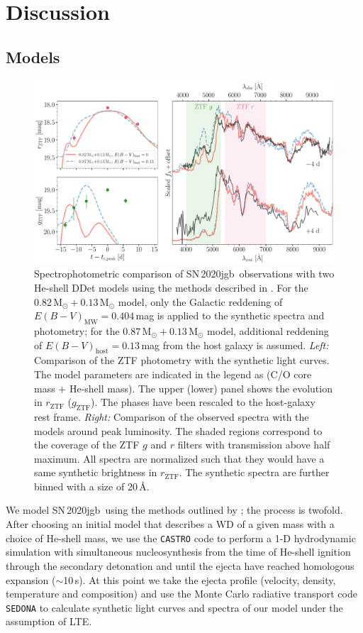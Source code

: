\documentclass[twocolumn]{aastex631}
\newcommand{\sn}{SN\,2020jgb}
\newcommand{\Msun}{\mathrm{M_\odot}}
\begin{document}
\section{Discussion} \label{sec:discussion}
\subsection{Models} \label{sec:model}
\begin{figure}
    \centering
    \includegraphics[width=\textwidth]{model.pdf}
    \caption{Spectrophotometric comparison of \sn\ observations with two He-shell DDet models using the methods described in \citet{polin_observational_2019}. For the $0.82\,\Msun+0.13\,\Msun$ model, only the Galactic reddening of $E(B-V)_\mathrm{MW}=0.404$\,mag is applied to the synthetic spectra and photometry; for the $0.87\,\Msun+0.13\,\Msun$ model, additional reddening of $E(B-V)_\mathrm{host}=0.13$\,mag from the host galaxy is assumed. {\it Left:} Comparison of the ZTF photometry with the synthetic light curves. The model parameters are indicated in the legend as (C/O core mass $+$ He-shell mass). The upper (lower) panel shows the evolution in $r_\mathrm{ZTF}$ ($g_\mathrm{ZTF}$). The phases have been rescaled to the host-galaxy rest frame. {\it Right:} Comparison of the observed spectra with the models around peak luminosity. The shaded regions correspond to the coverage of the ZTF $g$ and $r$ filters with transmission above half maximum. All spectra are normalized such that they would have a same synthetic brightness in $r_\mathrm{ZTF}$. The synthetic spectra are further binned with a size of 20\,\AA.}
    \label{fig:model}
\end{figure}

We model \sn\ using the methods outlined by \citet{polin_observational_2019}; the process is twofold. After choosing an initial model that describes a WD of a given mass with a choice of He-shell mass, we use the \texttt{CASTRO} code \citep{Almgren_Castro_2010} to perform a 1-D hydrodynamic simulation with simultaneous nucleosynthesis from the time of He-shell ignition through the secondary detonation and until the ejecta have reached homologous expansion ($\sim$10\,s). At this point we take the ejecta profile (velocity, density, temperature and composition) and use the Monte Carlo radiative transport code \texttt{SEDONA} \citep{Kasen_Sedona_2006} to calculate synthetic light curves and spectra of our model under the assumption of LTE. 
\end{document}
